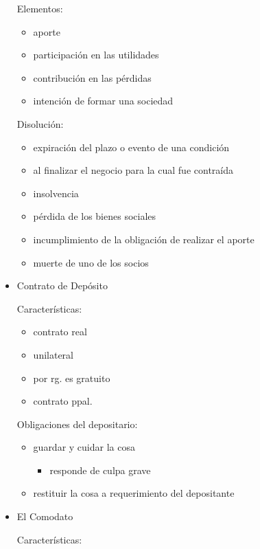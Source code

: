 \documentclass[]{article}
\providecommand{\tightlist}{%
  \setlength{\itemsep}{0pt}\setlength{\parskip}{0pt}}
\begin{document}
\begin{itemize}
  Elementos:

  \begin{itemize}
  \tightlist
  \item
    aporte
  \item
    participación en las utilidades
  \item
    contribución en las pérdidas
  \item
    intención de formar una sociedad
  \end{itemize}

  Disolución:

  \begin{itemize}
  \tightlist
  \item
    expiración del plazo o evento de una condición
  \item
    al finalizar el negocio para la cual fue contraída
  \item
    insolvencia
  \item
    pérdida de los bienes sociales
  \item
    incumplimiento de la obligación de realizar el aporte
  \item
    muerte de uno de los socios
  \end{itemize}
\item
  Contrato de Depósito

  Características:

  \begin{itemize}
  \tightlist
  \item
    contrato real
  \item
    unilateral
  \item
    por rg. es gratuito
  \item
    contrato ppal.
  \end{itemize}

  Obligaciones del depositario:

  \begin{itemize}
  \tightlist
  \item
    guardar y cuidar la cosa

    \begin{itemize}
    \tightlist
    \item
      responde de culpa grave
    \end{itemize}
  \item
    restituir la cosa a requerimiento del depositante
  \end{itemize}
\item
  El Comodato

  Características:


\end{itemize}
\end{document}
